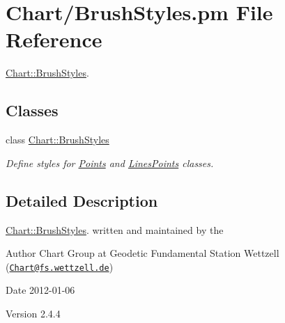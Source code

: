 \hypertarget{BrushStyles_8pm}{
\section{Chart/BrushStyles.pm File Reference}
\label{BrushStyles_8pm}
}


\hyperlink{classChart_1_1BrushStyles}{Chart::BrushStyles}.  


\subsection*{Classes}
\begin{DoxyCompactItemize}
\item 
class \hyperlink{classChart_1_1BrushStyles}{Chart::BrushStyles}
\begin{DoxyCompactList}\small\item\em Define styles for \hyperlink{classChart_1_1Points}{Points} and \hyperlink{classChart_1_1LinesPoints}{LinesPoints} classes. \item\end{DoxyCompactList}\end{DoxyCompactItemize}


\subsection{Detailed Description}
\hyperlink{classChart_1_1BrushStyles}{Chart::BrushStyles}. written and maintained by the \begin{DoxyAuthor}{Author}
Chart Group at Geodetic Fundamental Station Wettzell (\href{mailto:Chart@fs.wettzell.de}{\tt Chart@fs.wettzell.de}) 
\end{DoxyAuthor}
\begin{DoxyDate}{Date}
2012-\/01-\/06 
\end{DoxyDate}
\begin{DoxyVersion}{Version}
2.4.4 
\end{DoxyVersion}
